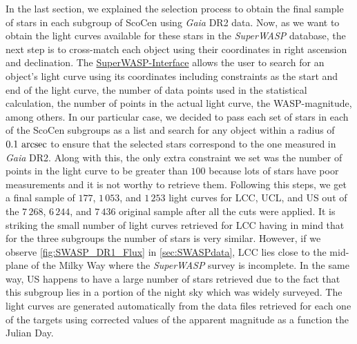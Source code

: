 In the last section, we explained the selection process to obtain the final sample of stars in each subgroup of ScoCen using \textit{Gaia} DR2 data. Now, as we want to obtain the light curves available for these stars in the \textit{SuperWASP} database, the next step is to cross-match each object using their coordinates in right ascension and declination. The \href{https://exoplanetarchive.ipac.caltech.edu/cgi-bin/TblSearch/nph-tblSearchInit?app=ExoTbls&config=superwasptimeseries}{SuperWASP-Interface} allows the user to search for an object's light curve using its coordinates including constraints as the start and end of the light curve, the number of data points used in the statistical calculation, the number of points in the actual light curve, the WASP-magnitude, among others. In our particular case, we decided to pass each set of stars in each of the ScoCen subgroups as a list and search for any object within a radius of $0.1~\textnormal{arcsec}$ to ensure that the selected stars correspond to the one measured in \textit{Gaia} DR2. Along with this, the only extra constraint we set was the number of points in the light curve to be greater than $100$ because lots of stars have poor measurements and it is not worthy to retrieve them. Following this steps, we get a final sample of $177$, $1\,053$, and $1\,253$ light curves for LCC, UCL, and US out of the $7\,268$, $6\,244$, and $7\,436$ original sample after all the cuts were applied. It is striking the small number of light curves retrieved for LCC having in mind that for the three subgroups the number of stars is very similar. However, if we observe \autoref{fig:SWASP_DR1_Flux} in \autoref{sec:SWASPdata}, LCC lies close to the mid-plane of the Milky Way where the \textit{SuperWASP} survey is incomplete. In the same way, US happens to have a large number of stars retrieved due to the fact that this subgroup lies in a portion of the night sky which was widely surveyed. The light curves are generated automatically from the data files retrieved for each one of the targets using corrected values of the apparent magnitude as a function the Julian Day.\\

